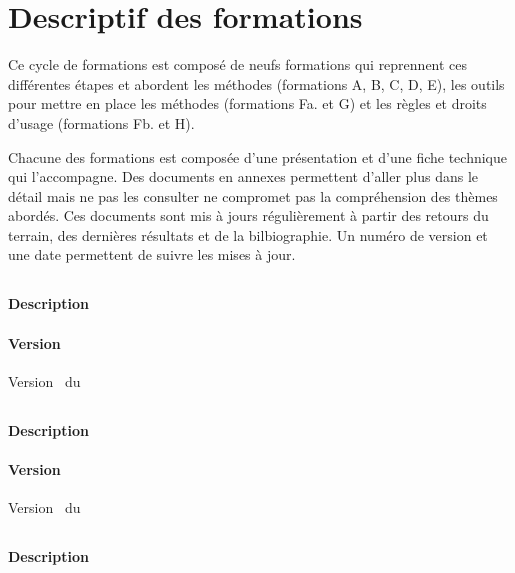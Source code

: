\section{Descriptif des formations}

Ce cycle de formations est composé de neufs formations qui reprennent ces différentes étapes et abordent les méthodes (formations A, B, C, D, E), les outils pour mettre en place les méthodes (formations Fa. et G) et les règles et droits d'usage (formations Fb. et H).

Chacune des formations est composée d'une présentation et d'une fiche technique qui l'accompagne. 
Des documents en annexes permettent d'aller plus dans le détail mais ne pas les consulter ne compromet pas la compréhension des thèmes abordés.
Ces documents sont mis à jours régulièrement à partir des retours du terrain, des dernières résultats et de la bilbiographie.
Un numéro de version et une date permettent de suivre les mises à jour.

\subsection{\formationA}
\paragraph{Description} \descriptifFA
\paragraph{Version} Version \versionFA~du \dateversionFA

\subsection{\formationB}
\paragraph{Description} \descriptifFB
\paragraph{Version} Version \versionFB~du \dateversionFB


\subsection{\formationC}
\paragraph{Description} \descriptifFC


